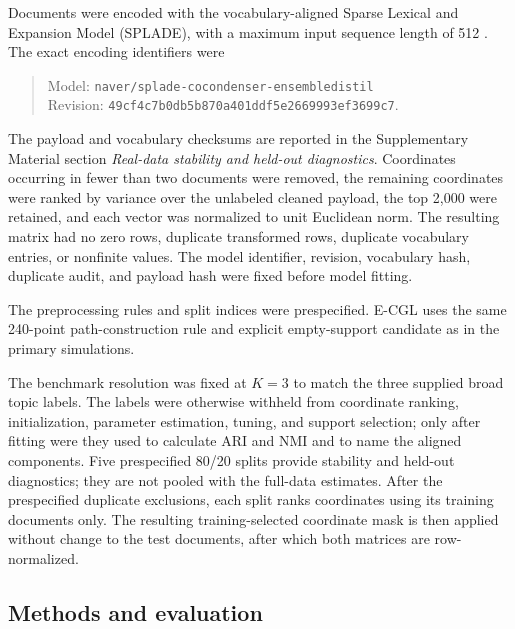 \documentclass[preprint,12pt,authoryear]{elsarticle}
\begin{document}
Documents were encoded with the vocabulary-aligned Sparse Lexical and
Expansion Model (SPLADE), with a maximum input sequence length of 512
\citep{formal2021splade,formal2022hardnegative}. The exact encoding identifiers
were
\begingroup\small
\begin{quote}\noindent
Model: \texttt{naver/splade-cocondenser-ensembledistil}\\
Revision: \texttt{49cf4c7b0db5b870a401ddf5e2669993ef3699c7}.
\end{quote}
\endgroup
The payload and vocabulary checksums are reported in the Supplementary
Material section \emph{Real-data stability and held-out diagnostics}.
Coordinates occurring in fewer than two documents were removed, the
remaining coordinates were ranked by variance over the unlabeled cleaned
payload, the top 2,000 were retained, and each vector was normalized to unit
Euclidean norm. The resulting matrix had no zero rows, duplicate
transformed rows, duplicate vocabulary entries, or nonfinite values. The
model identifier, revision, vocabulary hash, duplicate audit, and payload hash
were fixed before model fitting.

The preprocessing rules and split indices were prespecified. E-CGL uses the
same 240-point path-construction rule and explicit empty-support candidate as
in the primary simulations.

The benchmark resolution was fixed at $K=3$ to match the three supplied broad
topic labels. The labels were otherwise withheld from coordinate ranking,
initialization, parameter estimation, tuning, and support selection; only after
fitting were they used to calculate ARI and NMI and to name the aligned
components.
Five prespecified 80/20 splits provide stability and held-out diagnostics; they
are not pooled with the full-data estimates. After
the prespecified duplicate exclusions, each split ranks coordinates using its
training documents only. The resulting training-selected coordinate mask is
then applied without change to the test documents, after which both matrices
are row-normalized.

\subsection{Methods and evaluation}
\end{document}
